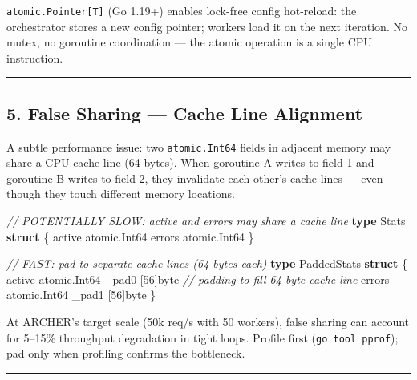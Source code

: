 \documentclass[
]{article}
\newenvironment{Shaded}{}{}
\newcommand{\CommentTok}[1]{\textcolor[rgb]{0.38,0.63,0.69}{\textit{#1}}}
\newcommand{\DataTypeTok}[1]{\textcolor[rgb]{0.56,0.13,0.00}{#1}}
\newcommand{\DecValTok}[1]{\textcolor[rgb]{0.25,0.63,0.44}{#1}}
\newcommand{\KeywordTok}[1]{\textcolor[rgb]{0.00,0.44,0.13}{\textbf{#1}}}
\newcommand{\NormalTok}[1]{#1}
\newcommand{\OperatorTok}[1]{\textcolor[rgb]{0.40,0.40,0.40}{#1}}
\begin{document}
\texttt{atomic.Pointer{[}T{]}} (Go 1.19+) enables lock-free config
hot-reload: the orchestrator stores a new config pointer; workers load
it on the next iteration. No mutex, no goroutine coordination --- the
atomic operation is a single CPU instruction.

\begin{center}\rule{0.5\linewidth}{0.5pt}\end{center}

\hypertarget{false-sharing-cache-line-alignment}{%
\subsection{5. False Sharing --- Cache Line
Alignment}\label{false-sharing-cache-line-alignment}}

A subtle performance issue: two \texttt{atomic.Int64} fields in adjacent
memory may share a CPU cache line (64 bytes). When goroutine A writes to
field 1 and goroutine B writes to field 2, they invalidate each other's
cache lines --- even though they touch different memory locations.

\begin{Shaded}
\begin{Highlighting}[]
\CommentTok{// POTENTIALLY SLOW: active and errors may share a cache line}
\KeywordTok{type}\NormalTok{ Stats }\KeywordTok{struct} \OperatorTok{\{}
\NormalTok{    active atomic}\OperatorTok{.}\NormalTok{Int64}
\NormalTok{    errors atomic}\OperatorTok{.}\NormalTok{Int64}
\OperatorTok{\}}

\CommentTok{// FAST: pad to separate cache lines (64 bytes each)}
\KeywordTok{type}\NormalTok{ PaddedStats }\KeywordTok{struct} \OperatorTok{\{}
\NormalTok{    active atomic}\OperatorTok{.}\NormalTok{Int64}
\NormalTok{    \_pad0  }\OperatorTok{[}\DecValTok{56}\OperatorTok{]}\DataTypeTok{byte}        \CommentTok{// padding to fill 64{-}byte cache line}
\NormalTok{    errors atomic}\OperatorTok{.}\NormalTok{Int64}
\NormalTok{    \_pad1  }\OperatorTok{[}\DecValTok{56}\OperatorTok{]}\DataTypeTok{byte}
\OperatorTok{\}}
\end{Highlighting}
\end{Shaded}

At ARCHER's target scale (50k req/s with 50 workers), false sharing can
account for 5--15\% throughput degradation in tight loops. Profile first
(\texttt{go\ tool\ pprof}); pad only when profiling confirms the
bottleneck.

\begin{center}\rule{0.5\linewidth}{0.5pt}\end{center}
\end{document}
